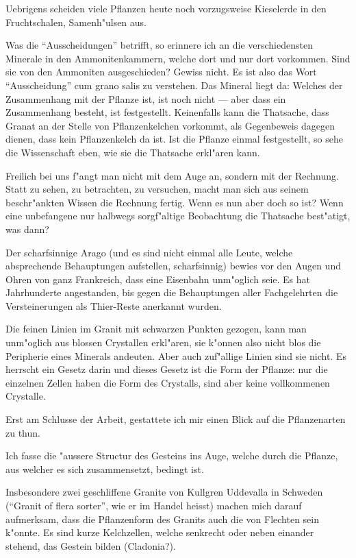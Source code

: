 \documentclass[a4paper, 11pt, oneside, german]{article}
\begin{document}
Uebrigens scheiden viele Pflanzen heute noch vorzugsweise Kieselerde in den Fruchtschalen, Samenh"ulsen aus.

Was die "`Ausscheidungen"' betrifft, so erinnere ich an die verschiedensten Minerale in den Ammonitenkammern, welche dort und nur dort vorkommen. Sind sie von den Ammoniten ausgeschieden? Gewiss nicht. Es ist also das Wort "`Ausscheidung"' cum grano salis zu verstehen. Das Mineral liegt da: Welches der Zusammenhang mit der Pflanze ist, ist noch nicht --- aber dass ein Zusammenhang besteht, ist festgestellt. Keinenfalls kann die Thatsache, dass Granat an der Stelle von Pflanzenkelchen vorkommt, als Gegenbeweis dagegen dienen, dass kein Pflanzenkelch da ist. Ist die Pflanze einmal festgestellt, so sehe die Wissenschaft eben, wie sie die Thatsache erkl"aren kann.

Freilich bei uns f"angt man nicht mit dem Auge an, sondern mit der Rechnung. Statt zu sehen, zu betrachten, zu versuchen, macht man sich aus seinem beschr"ankten Wissen die Rechnung fertig. Wenn es nun aber doch so ist? Wenn eine unbefangene nur halbwegs sorgf"altige Beobachtung die Thatsache best"atigt, was dann?

Der scharfsinnige Arago (und es sind nicht einmal alle Leute, welche absprechende Behauptungen aufstellen, scharfsinnig) bewies vor den Augen und Ohren von ganz Frankreich, dass eine Eisenbahn unm"oglich seie. Es hat Jahrhunderte angestanden, bis gegen die Behauptungen aller Fachgelehrten die Versteinerungen als Thier-Reste anerkannt wurden.

Die feinen Linien im Granit mit schwarzen Punkten gezogen, kann man unm"oglich aus blossen Crystallen erkl"aren, sie k"onnen also nicht blos die Peripherie eines Minerals andeuten. Aber auch zuf"allige Linien sind sie nicht. Es herrscht ein Gesetz darin und dieses Gesetz ist die Form der Pflanze: nur die einzelnen Zellen haben die Form des Crystalls, sind aber keine vollkommenen Crystalle.

Erst am Schlusse der Arbeit, gestattete ich mir einen Blick auf die Pflanzenarten zu thun.

Ich fasse die "aussere Structur des Gesteins ins Auge, welche durch die Pflanze, aus welcher es sich zusammensetzt, bedingt ist.

Insbesondere zwei geschliffene Granite von Kullgren Uddevalla in Schweden ("`Granit of flera sorter"', wie er im Handel heisst) machen mich darauf aufmerksam, dass die Pflanzenform des Granits auch die von Flechten sein k"onnte. Es sind kurze Kelchzellen, welche senkrecht oder neben einander stehend, das Gestein bilden (Cladonia?).
\end{document}
